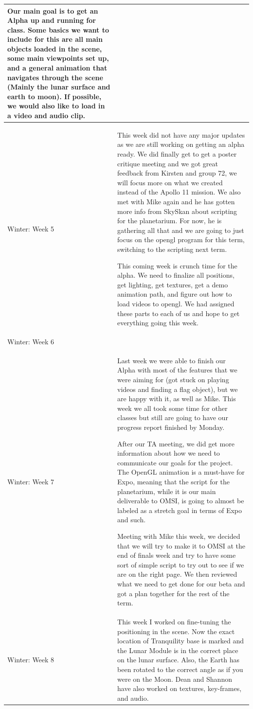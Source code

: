 \documentclass[onecolumn, draftclsnofoot,10pt, compsoc]{IEEEtran}
\begin{document}
\begin{longtable} {|p{1.5cm}|p{13.5cm}|}
Our main goal is to get an Alpha up and running for class. Some basics we want to include for this are all main objects loaded in the scene, some main viewpoints set up, and a general animation that navigates through the scene (Mainly the lunar surface and earth to moon). If possible, we would also like to load in a video and audio clip. 
\\ \hline

Winter: Week 5 & This week did not have any major updates as we are still working on getting an alpha ready. We did finally get to get a poster critique meeting and we got great feedback from Kirsten and group 72, we will focus more on what we created instead of the Apollo 11 mission. We also met with Mike again and he has gotten more info from SkySkan about scripting for the planetarium. For now, he is gathering all that and we are going to just focus on the opengl program for this term, switching to the scripting next term. 

This coming week is crunch time for the alpha. We need to finalize all positions, get lighting, get textures, get a demo animation path, and figure out how to load videos to opengl. We had assigned these parts to each of us and hope to get everything going this week. 
\\ \hline

Winter: Week 6 & 
\\ \hline

Winter: Week 7 & 
Last week we were able to finish our Alpha with most of the features that we were aiming for (got stuck on playing videos and finding a flag object), but we are happy with it, as well as Mike. This week we all took some time for other classes but still are going to have our progress report finished by Monday. 

After our TA meeting, we did get more information about how we need to communicate our goals for the project. The OpenGL animation is a must-have for Expo, meaning that the script for the planetarium, while it is our main deliverable to OMSI, is going to almost be labeled as a stretch goal in terms of Expo and such. 

Meeting with Mike this week, we decided that we will try to make it to OMSI at the end of finals week and try to have some sort of simple script to try out to see if we are on the right page. We then reviewed what we need to get done for our beta and got a plan together for the rest of the term. 
\\ \hline

Winter: Week 8 & This week I worked on fine-tuning the positioning in the scene. Now the exact location of Tranquility base is marked and the Lunar Module is in the correct place on the lunar surface. Also, the Earth has been rotated to the correct angle as if you were on the Moon. Dean and Shannon have also worked on textures, key-frames, and audio.


\end{longtable}
\end{document}

